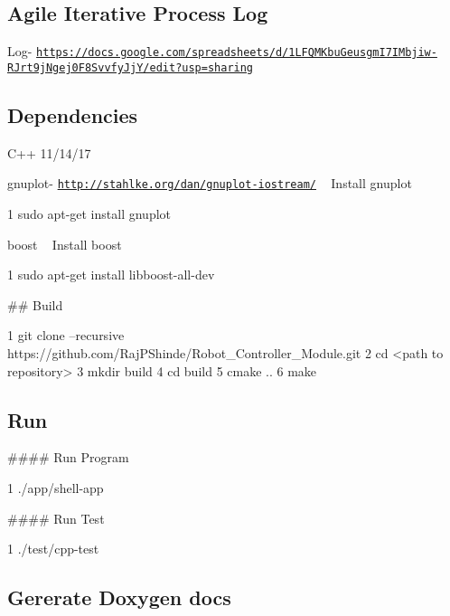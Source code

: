 \subsection*{Agile Iterative Process Log}

Log-\/ \href{https://docs.google.com/spreadsheets/d/1LFQMKbuGeusgmI7IMbjiw-RJrt9jNgej0F8SvvfyJjY/edit?usp=sharing}{\tt https\+://docs.\+google.\+com/spreadsheets/d/1\+L\+F\+Q\+M\+Kbu\+Geusgm\+I7\+I\+Mbjiw-\/\+R\+Jrt9j\+Ngej0\+F8\+Svvfy\+Jj\+Y/edit?usp=sharing}

\subsection*{Dependencies}


\begin{DoxyEnumerate}
\item C++ 11/14/17
\item gnuplot-\/ \href{http://stahlke.org/dan/gnuplot-iostream/}{\tt http\+://stahlke.\+org/dan/gnuplot-\/iostream/} ~\newline
Install gnuplot 
\begin{DoxyCode}
1 sudo apt-get install gnuplot
\end{DoxyCode}

\item boost ~\newline
Install boost 
\begin{DoxyCode}
1 sudo apt-get install libboost-all-dev
\end{DoxyCode}

\end{DoxyEnumerate}

\#\# Build 
\begin{DoxyCode}
1 git clone --recursive https://github.com/RajPShinde/Robot\_Controller\_Module.git
2 cd <path to repository>
3 mkdir build
4 cd build
5 cmake ..
6 make
\end{DoxyCode}
 \subsection*{Run}

\#\#\#\# Run Program 
\begin{DoxyCode}
1 ./app/shell-app
\end{DoxyCode}
 \#\#\#\# Run Test 
\begin{DoxyCode}
1 ./test/cpp-test
\end{DoxyCode}
 \subsection*{Gererate Doxygen docs}

